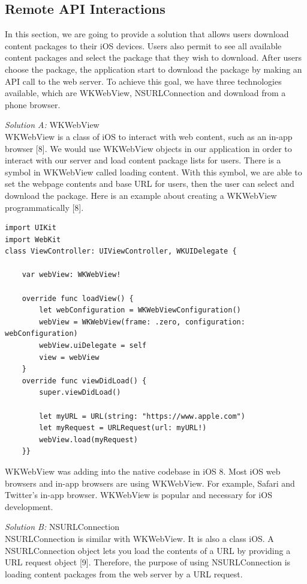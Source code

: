 \documentclass[letterpaper, 10pt,titlepage]{article}
\begin{document}
\subsection{Remote API Interactions}
In this section, we are going to provide a solution that allows users download content packages to their iOS devices. Users also permit to see all available content packages and select the package that they wish to download. After users choose the package, the application start to download the package by making an API call to the web server. To achieve this goal, we have three technologies available, which are WKWebView, NSURLConnection and download from a phone browser.


\textit{Solution A:} WKWebView\\
WKWebView is a class of iOS to interact with web content, such as an in-app browser [8]. We would use WKWebView objects in our application in order to interact with our server and load content package lists for users. There is a symbol in WKWebView called loading content. With this symbol, we are able to set the webpage contents and base URL for users, then the user can select and download the package. Here is an example about creating a WKWebView programmatically [8].

\begin{verbatim}
import UIKit
import WebKit
class ViewController: UIViewController, WKUIDelegate {
    
    var webView: WKWebView!
    
    override func loadView() {
        let webConfiguration = WKWebViewConfiguration()
        webView = WKWebView(frame: .zero, configuration: webConfiguration)
        webView.uiDelegate = self
        view = webView
    }
    override func viewDidLoad() {
        super.viewDidLoad()
        
        let myURL = URL(string: "https://www.apple.com")
        let myRequest = URLRequest(url: myURL!)
        webView.load(myRequest)
    }}
\end{verbatim}

WKWebView was adding into the native codebase in iOS 8. Most iOS web browsers and in-app browsers are using WKWebView. For example, Safari and Twitter’s in-app browser. WKWebView is popular and necessary for iOS development.


\textit{Solution B:} NSURLConnection \\
NSURLConnection is similar with WKWebView. It is also a class iOS. A NSURLConnection object lets you load the contents of a URL by providing a URL request object [9]. Therefore, the purpose of using NSURLConnection is loading content packages from the web server by a URL request. 
\end{document}
